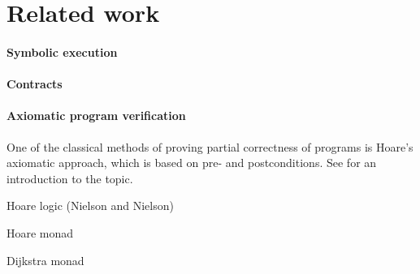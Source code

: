 


\section{Related work}
\label{sec:relatedwork}

\paragraph{Symbolic execution}

\paragraph{Contracts}

\paragraph{Axiomatic program verification}

One of the classical methods of proving partial correctness of programs is Hoare's axiomatic approach, which is based on pre- and postconditions.
See \citet{NielsonN1992} for an introduction to the topic.

\begin{compactitem}
\item Hoare logic (Nielson and Nielson)
\item Hoare monad
\item Dijkstra monad
\end{compactitem}
